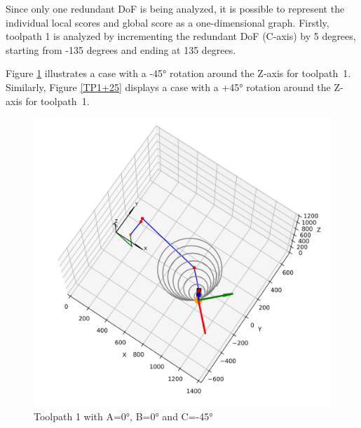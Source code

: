 Since only one redundant \acrshort{DoF} is being analyzed, it is possible to represent the individual local scores and global score as a one-dimensional graph. Firstly, toolpath 1 is analyzed by incrementing the redundant \acrshort{DoF} (C-axis) by 5 degrees, starting from -135 degrees and ending at 135 degrees.


Figure \ref{TP1-25} illustrates a case with a -45° rotation around the Z-axis for toolpath~1.
Similarly, Figure \ref{TP1+25} displays a case with a +45° rotation around the Z-axis for toolpath~1.

\begin{figure}[H]
	\centering
	\begin{minipage}{0.5\textwidth}
		\includegraphics[width=\textwidth]{figures/robotANDpath1_-45.png}
		\caption{Toolpath 1 with A=0°, B=0° and C=-45°}
		\label{TP1-25}
	\end{minipage}\hfill
	\begin{minipage}{0.5\textwidth}

\end{minipage}
\end{figure}
